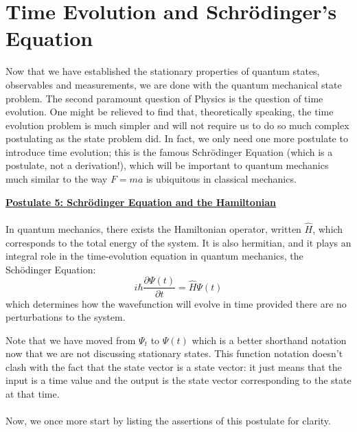 \section{Time Evolution and Schr\"{o}dinger's Equation} 
Now that we have established the stationary properties of quantum states, observables and measurements, we are done with the quantum mechanical state problem. The second paramount question of Physics is the question of time evolution. One might be relieved to find that, theoretically speaking, the time evolution problem is much simpler and will not require us to do so much complex postulating as the state problem did. In fact, we only need one more postulate to introduce time evolution; this is the famous Schr\"{o}dinger Equation (which is a postulate, not a derivation!), which will be important to quantum mechanics much similar to the way $F=ma$ is ubiquitous in classical mechanics.
\begin{tcolorbox}
\underline{\textbf{Postulate 5: Schr\"{o}dinger Equation and the Hamiltonian}}\\\\
In quantum mechanics, there exists the Hamiltonian operator, written $\hat{H}$, which corresponds to the total energy of the system. It is also hermitian, and it plays an integral role in the time-evolution equation in quantum mechanics, the Sch\"{o}dinger Equation:
$$
i\hbar\frac{\partial \Psi(t)}{\partial t}=\hat{H}\Psi(t)
$$
which determines how the wavefunction will evolve in time provided there are no perturbations to the system.
\end{tcolorbox} 
Note that we have moved from $\Psi_{t}$ to $\Psi(t)$
which is a better shorthand notation now that we are not discussing stationary states. This function notation doesn't clash with the fact that the state vector is a state vector: it just means that the input is a time value and the output is the state vector corresponding to the state at that time.
\\\\
Now, we once more start by listing the assertions of this postulate for clarity.
